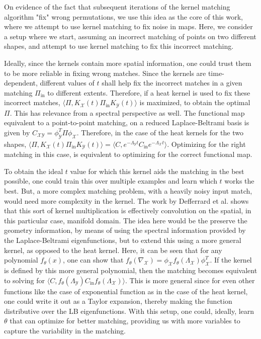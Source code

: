 \documentclass{article}
\begin{document}
On evidence of the fact that subsequent iterations of the kernel matching algorithm "fix" wrong permutations, we use this idea as the core of this work, where we attempt to use kernel matching to fix noise in maps. Here, we consider a setup where we start, assuming an incorrect matching of points on two different shapes, and attempt to use kernel matching to fix this incorrect matching.

Ideally, since the kernels contain more spatial information, one could trust them to be more reliable in fixing wrong matches. Since the kernels are time-dependent, different values of $t$ shall help fix the incorrect matches in a given matching $\Pi_\text{in}$ to different extents. Therefore, if a heat kernel is used to fix these incorrect matches, $\langle \Pi, K_\mathcal{X}(t)\Pi_\text{in} K_\mathcal{Y}(t)\rangle$ is maximized, to obtain the optimal $\Pi$. This has relevance from a spectral perspective as well. The functional map equivalent to a point-to-point matching, on a reduced Laplace-Beltrami basis is given by $C_{\mathcal{X}\mathcal{Y}} = \phi_\mathcal{Y}^T\Pi\phi_\mathcal{X}$. Therefore, in the case of the heat kernels for the two shapes, $\langle \Pi, K_\mathcal{X}(t)\Pi_\text{in} K_\mathcal{Y}(t)\rangle = \langle C, e^{-\Lambda_\mathcal{Y}t}C_\text{in}e^{-\Lambda_\mathcal{X}t} \rangle$. Optimizing for the right matching in this case, is equivalent to optimizing for the correct functional map. 

To obtain the ideal $t$ value for which this kernel aids the matching in the best possible, one could train this over multiple examples and learn which $t$ works the best. But, a more complex matching problem, with a heavily noisy input match, would need more complexity in the kernel. The work by Defferrard et al.\cite{defferrard2016convolutional} shows that this sort of kernel multiplication is effectively convolution on the spatial, in this particular case, manifold domain. The idea here would be the preserve the geometry information, by means of using the spectral information provided by the Laplace-Beltrami eigenfunctions, but to extend this using a more general kernel, as opposed to the heat kernel. Here, it can be seen that for any polynomial $f_\theta(x)$, one can show that $f_\theta(\nabla_\mathcal{X}) = \phi_\mathcal{X}f_\theta(\Lambda_\mathcal{X})\phi_\mathcal{X}^T$. If the kernel is defined by this more general polynomial, then the matching becomes equivalent to solving for $\langle C, f_\theta(\Lambda_\mathcal{Y})C_\text{in}f_\theta(\Lambda_\mathcal{X}) \rangle$. This is more general since for even other functions like the case of exponential function as in the case of the heat kernel, one could write it out as a Taylor expansion, thereby making the function distributive over the LB eigenfunctions. With this setup, one could, ideally, learn $\theta$ that can optimize for better matching, providing us with more variables to capture the variability in the matching. 



\end{document}
